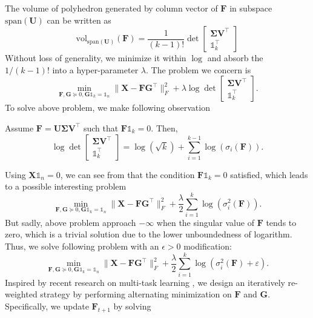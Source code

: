 \documentclass[journal]{IEEEtran}
\begin{document}
The volume of polyhedron generated by column vector of $\mathbf{F}$ in subspace $\text{span}(\mathbf{U})$ can be written as
\[
\text{vol}_{\text{span}(\mathbf{U})}(\mathbf{F}) = \frac{1}{(k-1)!} \det 
\left[ \begin{array}{c}
\mathbf{\Sigma V}^\top \\ \mathbb{1}_k^\top \end{array} 
\right]
\]
Without loss of generality, we minimize it within $\log$ and absorb the $1/(k-1)!$ into a hyper-parameter $\lambda$. The problem we concern is
\[
\min_{\mathbf{F},\mathbf{G}\succeq 0,\mathbf{G}\mathbb{1}_k = \mathbb{1}_n} \| \mathbf{X} - \mathbf{FG}^\top\|_F^2 + \lambda \log \det 
\left[ \begin{array}{c}
\mathbf{\Sigma V}^\top \\ \mathbb{1}_k^\top \end{array}
\right].
\]
To solve above problem, we make following observation
\begin{Lemma1}
	Assume $\mathbf{F}=\mathbf{U\Sigma V}^\top$ such that $\mathbf{F}\mathbb{1}_k = 0$. Then,
	\[
	\log \det 
	\left[ \begin{array}{c}
	\mathbf{\Sigma V}^\top \\ \mathbb{1}_k^\top \end{array}
	\right] = \log(\sqrt{k}) +  \sum_{i=1}^{k-1} \log(\sigma_i(\mathbf{F})).
	\]
\end{Lemma1}
Using $\mathbf{X}\mathbb{1}_n = 0$, we can see from  that the condition $\mathbf{F}\mathbb{1}_k = 0$ satisfied,
which leads to a possible interesting problem
\[
\min_{\mathbf{F},\mathbf{G}\succeq 0,\mathbf{G}\mathbb{1}_k = \mathbb{1}_n} \| \mathbf{X} - \mathbf{FG}^\top\|_F^2 + \frac{\lambda}{2} \sum_{i=1}^k \log(\sigma_i^2(\mathbf{F})).
\]
But sadly, above problem approach $-\infty$ when the singular value of $\mathbf{F}$ tends to zero, which is a trivial solution due to the lower unboundedness of logarithm.
Thus, we solve following problem with an $\epsilon > 0$ modification:
\begin{equation}\label{eq:mvsfm}
\min_{\mathbf{F},\mathbf{G}\succeq 0,\mathbf{G}\mathbb{1}_k = \mathbb{1}_n} \| \mathbf{X} - \mathbf{FG}^\top\|_F^2 + \frac{\lambda}{2} \sum_{i=1}^k \log(\sigma_i^2(\mathbf{F}) + \varepsilon).
\end{equation}
Inspired by recent research on multi-task learning \cite{nie2018calibrated}, we design an iteratively re-weighted strategy  by performing alternating minimization on $\mathbf{F}$ and $\mathbf{G}$. Specifically, we update $\mathbf{F}_{t+1}$ by solving 
\end{document}
